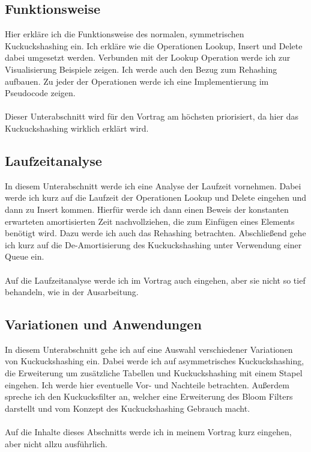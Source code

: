 \documentclass{article}
\begin{document}
\subsection{Funktionsweise}
Hier erkläre ich die Funktionsweise des normalen, symmetrischen Kuckuckshashing ein. Ich erkläre wie die Operationen Lookup, Insert und Delete dabei umgesetzt werden. 
Verbunden mit der Lookup Operation werde ich zur Visualisierung Beispiele zeigen. Ich werde auch den Bezug zum Rehashing aufbauen. Zu jeder der Operationen werde ich eine 
Implementierung im Pseudocode zeigen.
\\ \\
Dieser Unterabschnitt wird für den Vortrag am höchsten priorisiert, da hier das Kuckuckshashing wirklich erklärt wird.

\subsection{Laufzeitanalyse}
In diesem Unterabschnitt werde ich eine Analyse der Laufzeit vornehmen. Dabei werde ich kurz auf die Laufzeit der Operationen Lookup und Delete eingehen und dann zu Insert 
kommen. Hierfür werde ich dann einen Beweis der konstanten erwarteten amortisierten Zeit nachvollziehen, die zum Einfügen eines Elements benötigt wird. Dazu werde ich auch 
das Rehashing betrachten. Abschließend gehe ich kurz auf die De-Amortisierung des Kuckuckshashing unter Verwendung einer Queue ein.
\\ \\
Auf die Laufzeitanalyse werde ich im Vortrag auch eingehen, aber sie nicht so tief behandeln, wie in der Ausarbeitung.

\subsection{Variationen und Anwendungen}
In diesem Unterabschnitt gehe ich auf eine Auswahl verschiedener Variationen von Kuckuckshashing ein. Dabei werde ich auf asymmetrisches Kuckuckshashing, die Erweiterung um 
zusätzliche Tabellen und Kuckuckshashing mit einem Stapel eingehen. Ich werde hier eventuelle Vor- und Nachteile betrachten. Außerdem spreche ich den Kuckucksfilter an, 
welcher eine Erweiterung des Bloom Filters darstellt und vom Konzept des Kuckuckshashing Gebrauch macht.
\\ \\
Auf die Inhalte dieses Abschnitts werde ich in meinem Vortrag kurz eingehen, aber nicht allzu ausführlich.
\end{document}
